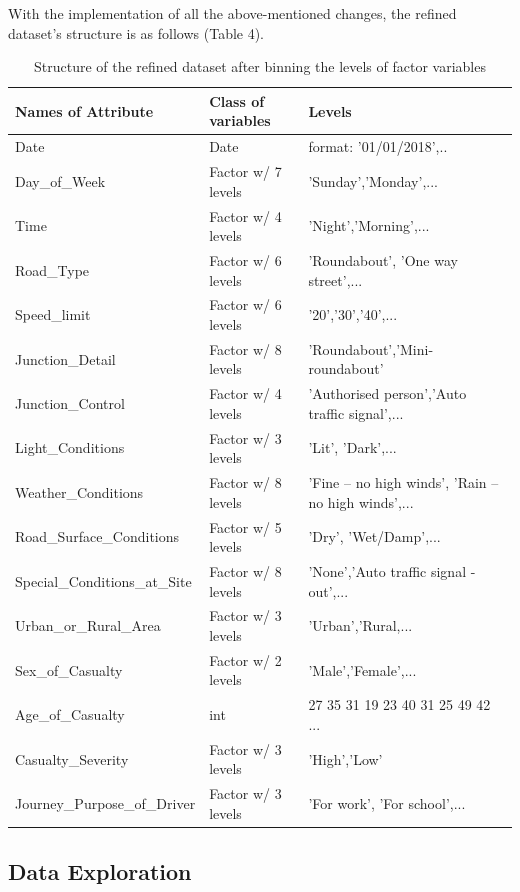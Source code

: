 \documentclass[
  a4paper,
]{article}
\begin{document}
With the implementation of all the above-mentioned changes, the refined
dataset's structure is as follows (Table 4).

\begin{table}[h]
\caption{Structure of the refined dataset after binning the levels of factor variables}
\bigskip
\centering
\begin{tabular}{l l l}
\hline\hline
Names of Attribute & Class of variables & Levels\\ [0.75ex]
\hline
Date & Date  & format: '01/01/2018',..\\
Day\_of\_Week & Factor w/ 7 levels & 'Sunday','Monday',...\\
Time & Factor w/ 4 levels & 'Night','Morning',...\\
Road\_Type & Factor w/ 6 levels & 'Roundabout', 'One way street',...\\
Speed\_limit & Factor w/ 6 levels  & '20','30','40',...\\
Junction\_Detail & Factor w/ 8 levels & 'Roundabout','Mini-roundabout'\\
Junction\_Control & Factor w/ 4 levels & 'Authorised person','Auto traffic signal',...\\
Light\_Conditions  & Factor w/ 3 levels & 'Lit', 'Dark',...\\
Weather\_Conditions   & Factor w/ 8 levels & 'Fine – no high winds', 'Rain – no high winds',...\\
Road\_Surface\_Conditions  & Factor w/ 5 levels & 'Dry', 'Wet/Damp',...\\
Special\_Conditions\_at\_Site  & Factor w/ 8 levels & 'None','Auto traffic signal - out',...\\
Urban\_or\_Rural\_Area  & Factor w/ 3 levels & 'Urban','Rural,...\\ 
Sex\_of\_Casualty   & Factor w/ 2 levels & 'Male','Female',...\\
Age\_of\_Casualty  & int &  27 35 31 19 23 40 31 25 49 42 ...\\
Casualty\_Severity  & Factor w/ 3 levels & 'High','Low'\\
Journey\_Purpose\_of\_Driver & Factor w/ 3 levels & 'For work', 'For school',...\\ [1ex]
\hline
\end{tabular}
\label{tab:Table 4}
\end{table}

\newpage

\hypertarget{data-exploration}{%
\subsection{Data Exploration}\label{data-exploration}}
\end{document}
